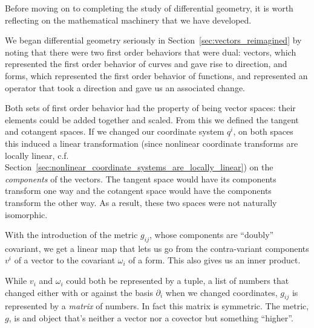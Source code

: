 \documentclass[../master.tex]{subfiles}
\begin{document}
	
	Before moving on to completing the study of differential geometry, it is worth reflecting on the mathematical machinery that we have developed. 
	
	We began differential geometry seriously in Section~\ref{sec:vectors_reimagined} by noting that there were two first order behaviors that were dual: vectors, which represented the first order behavior of curves and gave rise to direction, and forms, which represented the first order behavior of functions, and represented an operator that took a direction and gave us an associated change.
	
	Both sets of first order behavior had the property of being vector spaces: their elements could be added together and scaled. From this we defined the tangent and cotangent spaces. If we changed our coordinate system $q^i$, on both spaces this induced a linear transformation (since nonlinear coordinate transforms are locally linear, c.f. Section~\ref{sec:nonlinear_coordinate_systems_are_locally_linear}) on the  \emph{components} of the vectors. The tangent space would have its components transform one way and the cotangent space would have the components transform the other way. As a result, these two spaces were not naturally isomorphic.
	
	With the introduction of the metric $g_{ij}$, whose components are ``doubly'' covariant, we get a linear map that lets us go from the contra-variant components $v^i$ of a vector to the covariant $\omega_i$ of a form. This also gives us an inner product. 
	
	While $v_i$ and $\omega_i$ could both be represented by a tuple, a list of numbers that changed either with or against the basis $\partial_i$ when we changed coordinates, $g_{ij}$ is represented by a \emph{matrix} of numbers. In fact this matrix is symmetric. The metric, $g$, is and object that's neither a vector nor a covector but something ``higher''.
	
\end{document}

